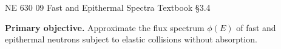 
\providecommand{\ndensity}{n^{\prime\prime\prime}}
\providecommand{\sfission}{s_f^{\prime\prime\prime}}
\providecommand{\dd}{\,\mathrm{d}}
\providecommand{\SourceEq}[1]{\par\nobreak\hfill{\sffamily\scriptsize\color{KSUGray}#1}\par}

\setlength{\abovedisplayskip}{4pt plus 1pt minus 1pt}
\setlength{\belowdisplayskip}{4pt plus 1pt minus 1pt}
\setlength{\abovedisplayshortskip}{3pt plus 1pt}
\setlength{\belowdisplayshortskip}{3pt plus 1pt}
\setlength{\jot}{2pt}

\HandoutSetup
  {NE 630}
  {09}
  {Fast and Epithermal Spectra}
  {Textbook \S3.4}


\MakeHandoutTitle

\textcolor{KSUDeepPurple}{\textbf{Primary objective.}}
Approximate the flux spectrum $\phi(E)$ of fast and epithermal neutrons
subject to elastic collisions without absorption.
\par\vspace{5pt}

